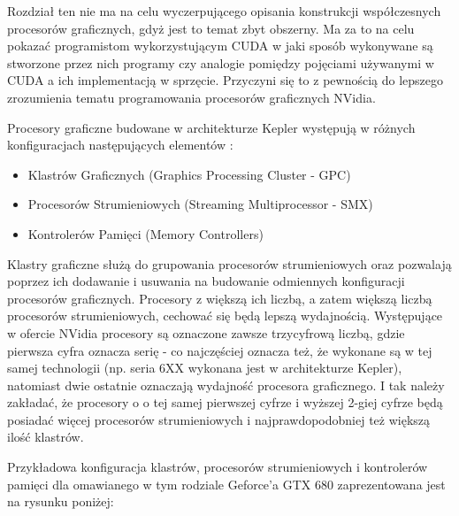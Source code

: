 Rozdział ten nie ma na celu wyczerpującego opisania konstrukcji współczesnych
procesorów graficznych, gdyż jest to temat zbyt obszerny. Ma za to na celu
pokazać programistom wykorzystującym CUDA w jaki sposób wykonywane są stworzone
przez nich programy czy analogie pomiędzy pojęciami używanymi w CUDA a ich
implementacją w sprzęcie. Przyczyni się to z pewnością do lepszego zrozumienia tematu
programowania procesorów graficznych NVidia.

Procesory graficzne budowane w architekturze Kepler występują w różnych
konfiguracjach następujących elementów \cite{gf680}:
\begin{itemize}
\item Klastrów Graficznych (Graphics Processing Cluster - GPC)
\item Procesorów Strumieniowych (Streaming Multiprocessor - SMX)
\item Kontrolerów Pamięci (Memory Controllers)
\end{itemize}

Klastry graficzne służą do grupowania procesorów strumieniowych oraz pozwalają
poprzez ich dodawanie i usuwania na budowanie odmiennych konfiguracji
procesorów graficznych\cite{gf680}. Procesory z większą ich liczbą, a zatem większą liczbą
procesorów strumieniowych, cechować się będą lepszą wydajnością. Występujące w
ofercie NVidia procesory są oznaczone zawsze trzycyfrową liczbą, gdzie pierwsza cyfra
oznacza serię - co najczęściej oznacza też, że wykonane są w tej samej
technologii (np. seria 6XX wykonana jest w architekturze Kepler), natomiast dwie
ostatnie oznaczają wydajność procesora graficznego. I tak należy zakładać, że
procesory o o tej samej pierwszej cyfrze i wyższej 2-giej cyfrze będą posiadać więcej procesorów
strumieniowych i najprawdopodobniej też większą ilość klastrów.

Przykładowa konfiguracja klastrów, procesorów strumieniowych i kontrolerów
pamięci dla omawianego w tym rodziale Geforce'a GTX 680 zaprezentowana jest na
rysunku poniżej:

